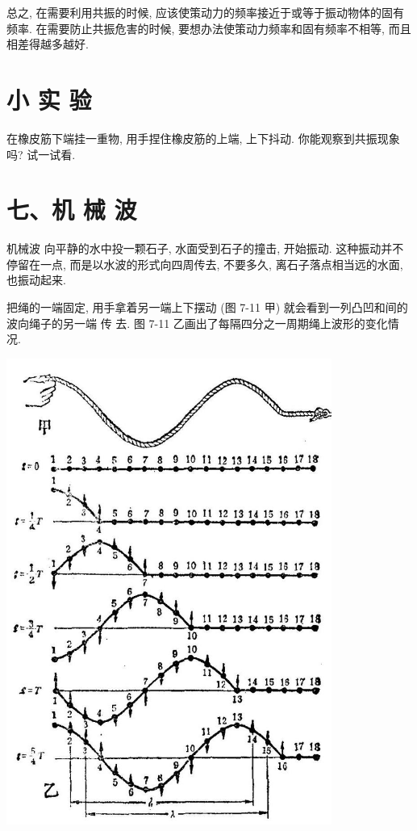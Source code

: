 \documentclass[10pt]{article}
\begin{document}
总之, 在需要利用共振的时候, 应该使策动力的频率接近于或等于振动物体的固有频率. 在需要防止共振危害的时候, 要想办法使策动力频率和固有频率不相等, 而且相差得越多越好.

\section*{小 实 验}

在橡皮筋下端挂一重物, 用手捏住橡皮筋的上端, 上下抖动. 你能观察到共振现象吗? 试一试看.

\section*{七、机 械 波}

机械波 向平静的水中投一颗石子, 水面受到石子的撞击, 开始振动. 这种振动并不停留在一点, 而是以水波的形式向四周传去, 不要多久, 离石子落点相当远的水面, 也振动起来.

把绳的一端固定, 用手拿着另一端上下摆动 (图 7-11 甲) 就会看到一列凸凹和间的波向绳子的另一端 传 去. 图 7-11 乙画出了每隔四分之一周期绳上波形的变化情况.

\begin{center}
\includegraphics[max width=0.8\textwidth]{images/01912d55-147c-70aa-b0e0-1782a122f948_205_894025.jpg}
\end{center}
\end{document}
